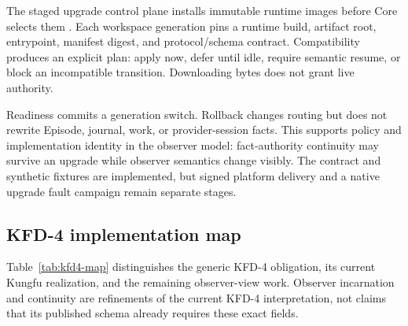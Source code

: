 The staged upgrade control plane installs immutable runtime images before Core
selects them \cite{kungfu2026upgrade}. Each workspace generation pins a runtime
build, artifact root, entrypoint, manifest digest, and protocol/schema contract.
Compatibility produces an explicit plan: apply now, defer until idle, require
semantic resume, or block an incompatible transition. Downloading bytes does
not grant live authority.

Readiness commits a generation switch. Rollback changes routing but does not
rewrite Episode, journal, work, or provider-session facts. This supports policy
and implementation identity in the observer model: fact-authority continuity
may survive an upgrade while observer semantics change visibly. The contract
and synthetic fixtures are implemented, but signed platform delivery and a
native upgrade fault campaign remain separate stages.

\subsection{KFD-4 implementation map}

Table~\ref{tab:kfd4-map} distinguishes the generic KFD-4 obligation, its current
Kungfu realization, and the remaining observer-view work. Observer incarnation
and continuity are refinements of the current KFD-4 interpretation, not claims
that its published schema already requires these exact fields.

